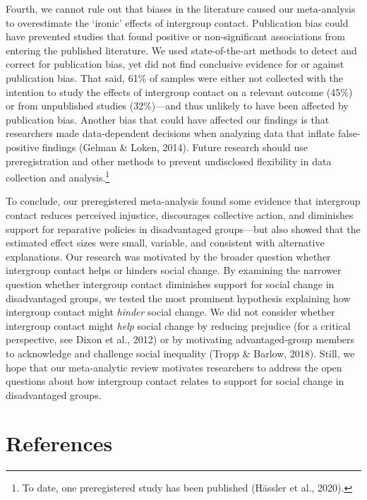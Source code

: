 \documentclass[twocolumn, 11pt, letterpaper]{article}
\begin{document}
Fourth, we cannot rule out that biases in the literature caused our
meta-analysis to overestimate the `ironic' effects of intergroup
contact. Publication bias could have prevented studies that found
positive or non-significant associations from entering the published
literature. We used state-of-the-art methods to detect and correct for
publication bias, yet did not find conclusive evidence for or against
publication bias. That said, 61\% of samples were either not collected
with the intention to study the effects of intergroup contact on a
relevant outcome (45\%) or from unpublished studies (32\%)---and thus
unlikely to have been affected by publication bias. Another bias that
could have affected our findings is that researchers made data-dependent
decisions when analyzing data that inflate false-positive findings
(Gelman \& Loken, 2014). Future research should use preregistration and
other methods to prevent undisclosed flexibility in data collection and
analysis.\footnote{To date, one preregistered study has been published
  (Hässler et al., 2020).}

To conclude, our preregistered meta-analysis found some evidence that
intergroup contact reduces perceived injustice, discourages collective
action, and diminishes support for reparative policies in disadvantaged
groups---but also showed that the estimated effect sizes were small,
variable, and consistent with alternative explanations. Our research was
motivated by the broader question whether intergroup contact helps or
hinders social change. By examining the narrower question whether
intergroup contact diminishes support for social change in disadvantaged
groups, we tested the most prominent hypothesis explaining how
intergroup contact might \emph{hinder} social change. We did not
consider whether intergroup contact might \emph{help} social change by
reducing prejudice (for a critical perspective, see Dixon et al., 2012)
or by motivating advantaged-group members to acknowledge and challenge
social inequality (Tropp \& Barlow, 2018). Still, we hope that our
meta-analytic review motivates researchers to address the open questions
about how intergroup contact relates to support for social change in
disadvantaged groups.

\hypertarget{references}{%
\section{References}\label{references}}

\begingroup
\end{document}
